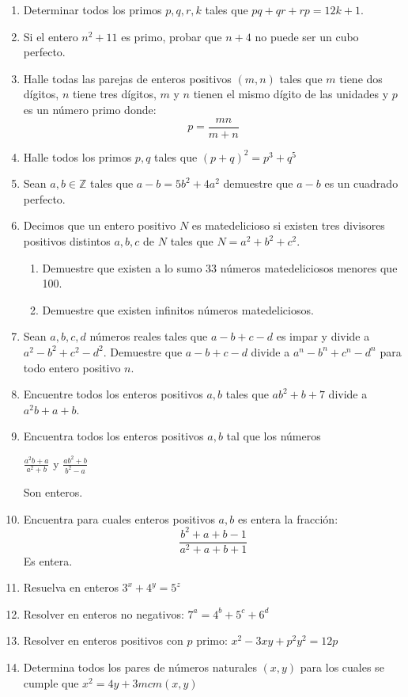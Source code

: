 \documentclass{book}
\newcommand{\Z}{\mathbb{Z}} \def\max{\mathop{\mbox{\rm máx}}} %
\begin{document}
\begin{enumerate}
    \item Determinar todos los primos $p,q,r,k$ tales que $pq+qr+rp= 12k + 1$.
    \item Si el entero $n^2 + 11$ es primo, probar que $n + 4$ no puede ser un cubo perfecto.
    \item Halle todas las parejas de enteros positivos $(m,n)$ tales que $m$ tiene dos dígitos, $n$ tiene tres dígitos, $m$ y                    $n$ tienen el mismo dígito de las unidades y $p$ es un número primo donde:
          $$p=\frac{mn}{m+n}$$
    \item Halle todos los primos $p,q$ tales que ${(p+q)}^2 = p^3+q^5$
    \item Sean $a,b\in \Z$ tales que $a-b=5b^2+4a^2$ demuestre que $a-b$ es un cuadrado perfecto.
    \item Decimos que un entero positivo $N$ es matedelicioso si existen tres divisores positivos distintos $a,b,c$ de $N$ tales que $N = a^2 + b^2 + c^2$.
          \begin{enumerate}
              \item Demuestre que existen a lo sumo 33 números matedeliciosos menores que 100.
              \item Demuestre que existen infinitos números matedeliciosos.
          \end{enumerate}
    \item Sean $a,b,c,d$ números reales tales que $a-b+c-d$ es impar y divide a $a^2-b^2+c^2-d^2$. Demuestre que
          $a-b+c-d$ divide a $a^n-b^n+c^n-d^n$ para todo entero positivo $n$.
    \item Encuentre todos los enteros positivos $a,b$ tales que $ab^2+b+7$ divide a $a^2b+a+b$.
    \item Encuentra todos los enteros positivos $a,b$ tal que los números
          \begin{center}
              $\displaystyle\frac{a^2b+a}{a^2+b}$ y $\displaystyle\frac{ab^2+b}{b^2-a}$
          \end{center}
          Son enteros.
    \item Encuentra para cuales enteros positivos $a,b$ es entera la fracción:
          $$\frac{b^2+a+b-1}{a^2+a+b+1}$$
          Es entera.
    \item Resuelva en enteros $3^x+4^y=5^z$
    \item Resolver en enteros no negativos: $7^a=4^b+5^c+6^d$
    \item Resolver en enteros positivos con $p$ primo: $x^2-3xy+p^2y^2=12p$
    \item Determina todos los pares de números naturales $(x,y)$ para los cuales se cumple que $x^2=4y+3mcm(x,y)$

\end{enumerate}
\end{document}
